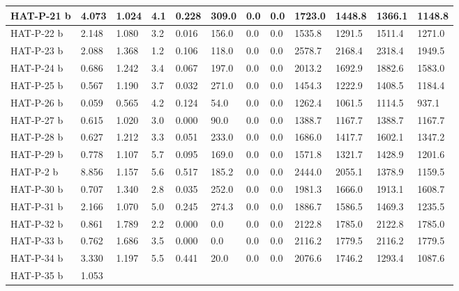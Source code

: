 \documentclass[letterpaper,10pt,english]{sphinxmanual}
\begin{document}
\begin{longtable}{|l|l|l|l|l|l|l|l|l|l|l|l|}
\\
\hline
HAT-P-21 b
 & 
4.073
 & 
1.024
 & 
4.1
 & 
0.228
 & 
309.0
 & 
0.0
 & 
0.0
 & 
1723.0
 & 
1448.8
 & 
1366.1
 & 
1148.8
\\
\hline
HAT-P-22 b
 & 
2.148
 & 
1.080
 & 
3.2
 & 
0.016
 & 
156.0
 & 
0.0
 & 
0.0
 & 
1535.8
 & 
1291.5
 & 
1511.4
 & 
1271.0
\\
\hline
HAT-P-23 b
 & 
2.088
 & 
1.368
 & 
1.2
 & 
0.106
 & 
118.0
 & 
0.0
 & 
0.0
 & 
2578.7
 & 
2168.4
 & 
2318.4
 & 
1949.5
\\
\hline
HAT-P-24 b
 & 
0.686
 & 
1.242
 & 
3.4
 & 
0.067
 & 
197.0
 & 
0.0
 & 
0.0
 & 
2013.2
 & 
1692.9
 & 
1882.6
 & 
1583.0
\\
\hline
HAT-P-25 b
 & 
0.567
 & 
1.190
 & 
3.7
 & 
0.032
 & 
271.0
 & 
0.0
 & 
0.0
 & 
1454.3
 & 
1222.9
 & 
1408.5
 & 
1184.4
\\
\hline
HAT-P-26 b
 & 
0.059
 & 
0.565
 & 
4.2
 & 
0.124
 & 
54.0
 & 
0.0
 & 
0.0
 & 
1262.4
 & 
1061.5
 & 
1114.5
 & 
937.1
\\
\hline
HAT-P-27 b
 & 
0.615
 & 
1.020
 & 
3.0
 & 
0.000
 & 
90.0
 & 
0.0
 & 
0.0
 & 
1388.7
 & 
1167.7
 & 
1388.7
 & 
1167.7
\\
\hline
HAT-P-28 b
 & 
0.627
 & 
1.212
 & 
3.3
 & 
0.051
 & 
233.0
 & 
0.0
 & 
0.0
 & 
1686.0
 & 
1417.7
 & 
1602.1
 & 
1347.2
\\
\hline
HAT-P-29 b
 & 
0.778
 & 
1.107
 & 
5.7
 & 
0.095
 & 
169.0
 & 
0.0
 & 
0.0
 & 
1571.8
 & 
1321.7
 & 
1428.9
 & 
1201.6
\\
\hline
HAT-P-2 b
 & 
8.856
 & 
1.157
 & 
5.6
 & 
0.517
 & 
185.2
 & 
0.0
 & 
0.0
 & 
2444.0
 & 
2055.1
 & 
1378.9
 & 
1159.5
\\
\hline
HAT-P-30 b
 & 
0.707
 & 
1.340
 & 
2.8
 & 
0.035
 & 
252.0
 & 
0.0
 & 
0.0
 & 
1981.3
 & 
1666.0
 & 
1913.1
 & 
1608.7
\\
\hline
HAT-P-31 b
 & 
2.166
 & 
1.070
 & 
5.0
 & 
0.245
 & 
274.3
 & 
0.0
 & 
0.0
 & 
1886.7
 & 
1586.5
 & 
1469.3
 & 
1235.5
\\
\hline
HAT-P-32 b
 & 
0.861
 & 
1.789
 & 
2.2
 & 
0.000
 & 
0.0
 & 
0.0
 & 
0.0
 & 
2122.8
 & 
1785.0
 & 
2122.8
 & 
1785.0
\\
\hline
HAT-P-33 b
 & 
0.762
 & 
1.686
 & 
3.5
 & 
0.000
 & 
0.0
 & 
0.0
 & 
0.0
 & 
2116.2
 & 
1779.5
 & 
2116.2
 & 
1779.5
\\
\hline
HAT-P-34 b
 & 
3.330
 & 
1.197
 & 
5.5
 & 
0.441
 & 
20.0
 & 
0.0
 & 
0.0
 & 
2076.6
 & 
1746.2
 & 
1293.4
 & 
1087.6
\\
\hline
HAT-P-35 b
 & 
1.053
 & 

\end{longtable}
\end{document}
